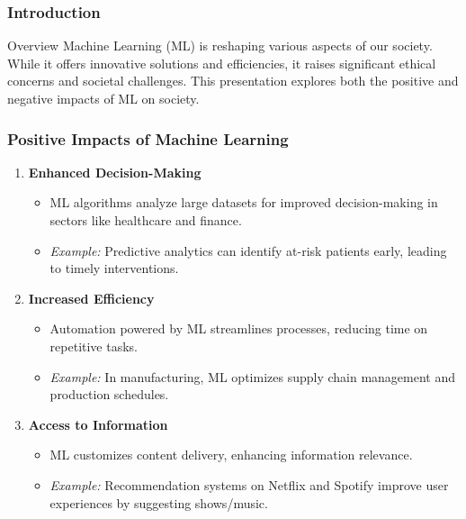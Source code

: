 \documentclass[aspectratio=169]{beamer}
\begin{document}
\begin{frame}[fragile]
    \frametitle{Introduction}
    \begin{block}{Overview}
        Machine Learning (ML) is reshaping various aspects of our society. While it offers innovative solutions and efficiencies, it raises significant ethical concerns and societal challenges. This presentation explores both the positive and negative impacts of ML on society.
    \end{block}
\end{frame}

\begin{frame}[fragile]
    \frametitle{Positive Impacts of Machine Learning}
    \begin{enumerate}
        \item \textbf{Enhanced Decision-Making}
        \begin{itemize}
            \item ML algorithms analyze large datasets for improved decision-making in sectors like healthcare and finance.
            \item \textit{Example:} Predictive analytics can identify at-risk patients early, leading to timely interventions.
         \end{itemize}

        \item \textbf{Increased Efficiency}
        \begin{itemize}
            \item Automation powered by ML streamlines processes, reducing time on repetitive tasks.
            \item \textit{Example:} In manufacturing, ML optimizes supply chain management and production schedules.
        \end{itemize}
        
        \item \textbf{Access to Information}
        \begin{itemize}
            \item ML customizes content delivery, enhancing information relevance.
            \item \textit{Example:} Recommendation systems on Netflix and Spotify improve user experiences by suggesting shows/music.
        \end{itemize}
    \end{enumerate}
\end{frame}
\end{document}

